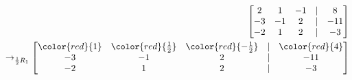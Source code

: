 \documentclass[preview]{standalone}
\begin{document}
\begin{align*}
\begin{bmatrix} 2 & 1 & -1 & | & 8 \\ -3 & -1 & 2 & | & -11 \\ -2 & 1 & 2 & | & -3 \end{bmatrix}\\ \rightarrow_{\frac{1}{2}R_1} \begin{bmatrix} \color{red}{1} & \color{red}{\frac{1}{2}} & \color{red}{-\frac{1}{2}} & | & \color{red}{4} \\ -3 & -1 & 2 & | & -11 \\ -2 & 1 & 2 & | & -3 \end{bmatrix}
\end{align*}
\end{document}
